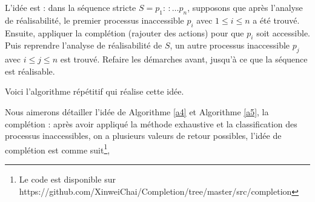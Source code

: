 \documentclass[11pt]{report}
\theoremstyle{definition}
\begin{document}
L'id\'ee est : dans la s\'equence stricte $S=p_1:\,:\ldots p_n$, supposons que apr\`es l'analyse de r\'ealisabilit\'e, le premier processus inaccessible $p_i$ avec $1\le i\le n$ a \'et\'e trouv\'e. Ensuite, appliquer la compl\'etion (rajouter des actions) pour que $p_i$ soit accessible. Puis reprendre l'analyse de r\'ealisabilit\'e de $S$, un autre processus inaccessible $p_j$ avec $i\le j\le n$ est trouv\'e. Refaire les d\'emarches avant, jusqu'\`a ce que la s\'equence est r\'ealisable.

Voici l'algorithme r\'ep\'etitif qui r\'ealise cette id\'ee.

\begin{algorithm}[ht]
 \caption{Structure de programme (Algorithmes mentionn\'es sont dans l'annexe)}
\end{algorithm}
Nous aimerons d\'etailler l'id\'ee de Algorithme \ref{a4} et Algorithme \ref{a5}, la compl\'etion : apr\`es avoir appliqu\'e la m\'ethode exhaustive et la classification des processus inaccessibles, on a plusieurs valeurs de retour possibles, l'id\'ee de compl\'etion est comme suit\footnote{Le code est disponible sur https://github.com/XinweiChai/Completion/tree/master/src/completion}, 
\end{document}
